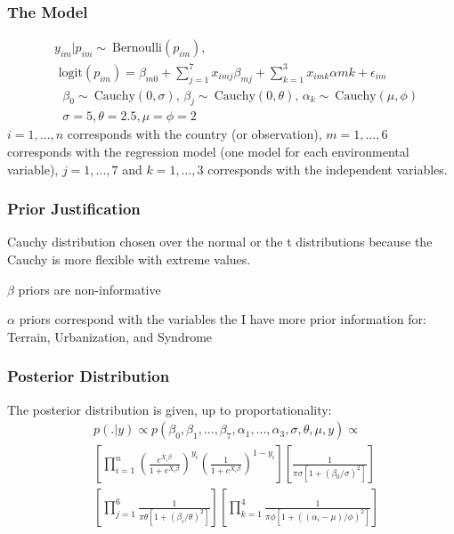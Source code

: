 \documentclass{beamer}
\begin{document}
\begin{frame}
\frametitle{The Model}
\begin{equation}
\begin{split}
&y_{im}|p_{im} \sim\ \text{Bernoulli}(p_{im}),  \\
&\text{  logit}(p_{im}) = \beta_{m0} + \sum_{j=1}^{7} x_{imj} \beta_{mj} + \sum_{k=1}^{3} x_{imk} \alpha{mk} + \epsilon_{im} \\
&\text{    } \beta_0 \sim\ \text{Cauchy}(0,\sigma) \text{, } \beta_{j} \sim\ \text{Cauchy}(0,\theta) \text{, } \alpha_k \sim\ \text{Cauchy}(\mu,\phi) \\
&\text{   } \sigma=5, \theta=2.5, \mu=\phi=2
\end{split}
\end{equation}
$i=1,...,n$ corresponds with the country (or observation), $m=1,...,6$ corresponds with the regression model (one model for each environmental variable), $j=1,...,7$ and $k=1,...,3$ corresponds with the independent variables.
\end{frame}

\begin{frame}
\frametitle{Prior Justification}
Cauchy distribution chosen over the normal or the t distributions because the Cauchy is more flexible with extreme values. 
\itemize
\item $\beta$ priors are non-informative
\item $\alpha$ priors correspond with the variables the I have more prior information for: Terrain, Urbanization, and Syndrome
\end{frame}

\begin{frame}
\frametitle{Posterior Distribution}
The posterior distribution is given, up to proportationality:
\begin{equation}
\begin{split}
&p(. | y) \propto 
p(\beta_0,\beta_1,...,\beta_7,\alpha_1,...,\alpha_3,\sigma,\theta,\mu, y) \propto  \\
&\left[\prod_{i=1}^{n} \left(\frac{e^{X_i\beta}}{1+e^{X_i\beta}}\right)^{y_i} \left(\frac{1}{1+e^{X_i\beta}}\right)^{1-y_i}\right] \left[\frac{1}{\pi\sigma\left[1+\left(\beta_0/\sigma\right)^2\right]}\right] \\
&\left[\prod_{j=1}^{6}\frac{1}{\pi\theta\left[1+\left(\beta_i/\theta\right)^2\right]}\right]
\left[\prod_{k=1}^{4}\frac{1}{\pi\phi\left[1+\left((\alpha_i-\mu)/{\phi}\right)^2\right]}\right] 
\end{split}
\end{equation}
\end{frame}
\end{document}
